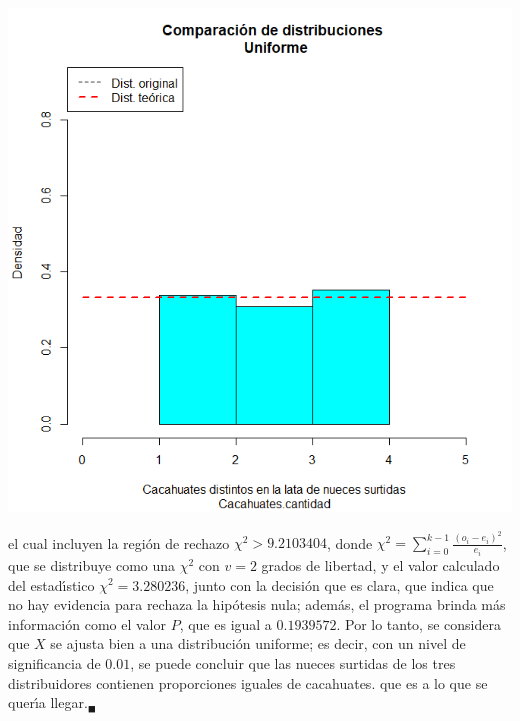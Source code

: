 \begin{solucion}
\begin{center}
  \includegraphics[scale=0.35]{Problema_107.png}
 \end{center}
 el cual incluyen la regi\'on de rechazo $\chi^2 > 9.2103404$,
 donde $\chi^2 = \sum_{i=0}^{k-1} \frac{\left( o_i - e_i \right)^2}{e_i}$,
 que se distribuye como una $\chi^2$ con $v=2$ grados de libertad,
 y el valor calculado del estad\'{\i}stico $\chi^2 = 3.280236$,
 junto con la decisi\'on que es clara, que indica que no hay evidencia
 para rechaza la hip\'otesis nula; adem\'as, el programa brinda m\'as
 informaci\'on como el valor $P$, que es igual a $0.1939572$.
 Por lo tanto, se considera que $X$ se ajusta bien a una distribuci\'on
 uniforme; es decir, con un nivel de significancia de $0.01$, se puede
 concluir que las nueces surtidas de los tres distribuidores
 contienen proporciones iguales de cacahuates.
 que es a lo que se quer\'{\i}a llegar.${}_{\blacksquare}$
\end{solucion}
